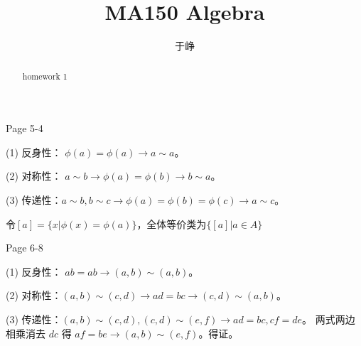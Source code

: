\documentclass{ximera}
\title{MA150 Algebra }
\author{于峥}
\begin{document}
\begin{abstract}
    homework 1
\end{abstract}
\maketitle

\begin{problem} Page 5-4
    \begin{solution}
        (1) 反身性： $\phi(a) = \phi(a) \rightarrow a \sim a$。

        (2) 对称性： $a \sim b \rightarrow  \phi(a) = \phi(b) \rightarrow b \sim a$。

        (3) 传递性：$a\sim b, b \sim c \rightarrow \phi(a) = \phi(b) = \phi(c) \rightarrow a \sim c$。

        令$[a] = \{x | \phi(x) = \phi(a)\}$，全体等价类为$\{[a] | a \in A \}$

    \end{solution}    
\end{problem} 

\begin{problem} Page 6-8
    \begin{solution}
        (1) 反身性： $ab = ab \rightarrow (a, b) \sim (a, b) $。

        (2) 对称性：$(a, b) \sim (c, d) \rightarrow ad = bc \rightarrow (c, d) \sim (a, b)$。

        (3) 传递性：$(a, b) \sim (c, d), (c, d) \sim (e, f) \rightarrow ad = bc, cf = de$。
        两式两边相乘消去 $dc$ 得 $ af=be \rightarrow (a, b) \sim (e, f)$。得证。
    \end{solution}
\end{problem} 
\end{document}
